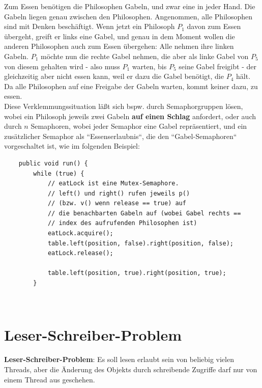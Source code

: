  Zum Essen benötigen die Philosophen Gabeln, und zwar eine in jeder Hand.
 Die Gabeln liegen genau zwischen den Philosophen.
 Angenommen, alle Philosophen sind mit Denken beschäftigt.
 Wenn jetzt ein Philosoph $P_1$ davon zum Essen übergeht, greift er links eine Gabel, und genau in dem Moment wollen die anderen Philosophen auch zum Essen übergehen: Alle nehmen ihre linken Gabeln.
$P_1$ möchte nun die rechte Gabel nehmen, die aber als linke Gabel von $P_5$ von diesem gehalten wird - also muss $P_1$ warten, bis $P_5$ seine Gabel freigibt - der gleichzeitig aber nicht essen kann, weil er dazu die Gabel benötigt, die $P_4$ hält.
Da alle Philosophen auf eine Freigabe der Gabeln warten, kommt keiner dazu, zu essen.\\

\noindent
Diese Verklemmungssituation läßt sich bspw. durch Semaphorgruppen lösen, wobei ein Philosoph jeweils zwei Gabeln \textbf{auf einen Schlag} anfordert, oder auch durch $n$ Semaphoren, wobei jeder Semaphor eine Gabel repräsentiert, und ein zusätzlicher Semaphor als ``Essenserlaubnis``, die den ``Gabel-Semaphoren`` vorgeschaltet ist, wie im folgenden Beispiel:

\begin{verbatim}
    public void run() {
        while (true) {
            // eatLock ist eine Mutex-Semaphore.
            // left() und right() rufen jeweils p()
            // (bzw. v() wenn release == true) auf
            // die benachbarten Gabeln auf (wobei Gabel rechts ==
            // index des aufrufenden Philosophen ist)
            eatLock.acquire();
            table.left(position, false).right(position, false);
            eatLock.release();

            table.left(position, true).right(position, true);
        }
\end{verbatim}\\



\section{Leser-Schreiber-Problem}

\textbf{Leser-Schreiber-Problem}: Es soll lesen erlaubt sein von beliebig vielen Threads, aber die Änderung des Objekts durch schreibende Zugriffe darf nur von einem Thread aus geschehen.\\

